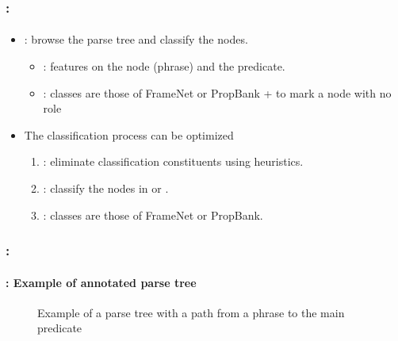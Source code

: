 \documentclass[xcolor=table]{beamer}
\begin{document}
\begin{frame}
	\frametitle{\insertshortsubtitle: \insertsection}
	\framesubtitle{\insertsubsection}
	
	\begin{itemize}
		\item {}: browse the parse tree and classify the nodes.
		\begin{itemize}
			\item {}: features on the node (phrase) and the predicate.
			\item {}: classes are those of FrameNet or PropBank +  to mark a node with no role
		\end{itemize} 
		\item The classification process can be optimized
		\begin{enumerate}
			\item {}: eliminate classification constituents using heuristics.
			\item {}: classify the nodes in  or .
			\item {}: classes are those of FrameNet or PropBank.
		\end{enumerate} 
	\end{itemize}
	
\end{frame}

\begin{frame}
	\frametitle{\insertshortsubtitle: \insertsection}
	\framesubtitle{\insertsubsection: Example of annotated parse tree}
	
	\vspace{-0.2cm}
	\begin{figure}
		\caption{Example of a parse tree with a path from a phrase to the main predicate \cite{2019-jurafsky-martin}}
	\end{figure}
	
\end{frame}
\end{document}
